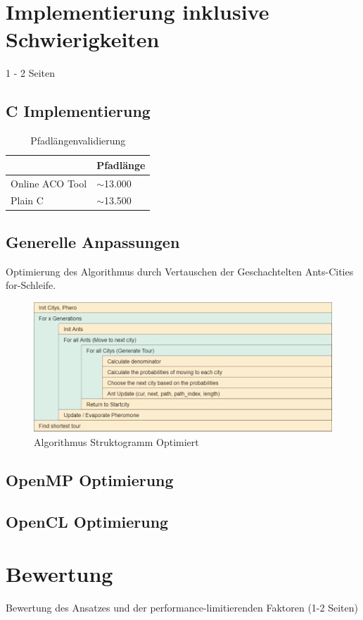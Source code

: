 \section{Implementierung inklusive Schwierigkeiten}
1 - 2 Seiten\\
\subsection*{C Implementierung}

\begin{table}[h]
    \centering
    \begin{tabular}{|l|l|}
    \hline
                    & Pfadlänge    \\ \hline
    Online ACO Tool & $\sim$13.000 \\ \hline
    Plain C         & $\sim$13.500 \\ \hline
    \end{tabular}
    \caption{\label{demo-table}Pfadlängenvalidierung}
\end{table}
\subsection*{Generelle Anpassungen}

Optimierung des Algorithmus durch Vertauschen der Geschachtelten Ants-Cities for-Schleife.
\begin{figure}[H]
    \centering
    \includegraphics[width=16cm]{../images/struktog-optimiert.png}
    \caption{Algorithmus Struktogramm Optimiert}
    \label{fig:struktogramm-optimiert}
\end{figure}

\subsection*{OpenMP Optimierung}

\subsection*{OpenCL Optimierung}

\section{Bewertung}
Bewertung des Ansatzes und der performance-limitierenden Faktoren (1-2 Seiten)
